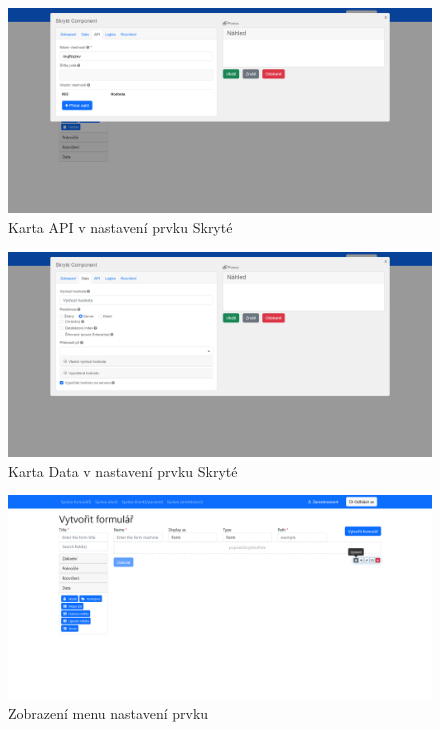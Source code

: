 \begin{figure}[H]
    \centering
    \includegraphics[width=\textwidth]{../img/screenshots/odvozena-hodnota-nastaveni-nazvu}
    \caption{Karta API v nastavení prvku Skryté}\label{fig:odvozena-hodnota-nastaveni-nazev}
\end{figure}

\begin{figure}[H]
    \centering
    \includegraphics[width=\textwidth]{../img/screenshots/odvozena-hodnota-vzorec-a-server}
    \caption{Karta Data v nastavení prvku Skryté}\label{fig:odvozena-hodnota-vzorec-a-server}
\end{figure}

\begin{figure}[H]
    \centering
    \includegraphics[width=\textwidth]{../img/screenshots/odvozena-hodnota-ozubene-kolo}
    \caption{Zobrazení menu nastavení prvku}\label{fig:odvozena-hodnota-ozubene-kolo}
\end{figure}

